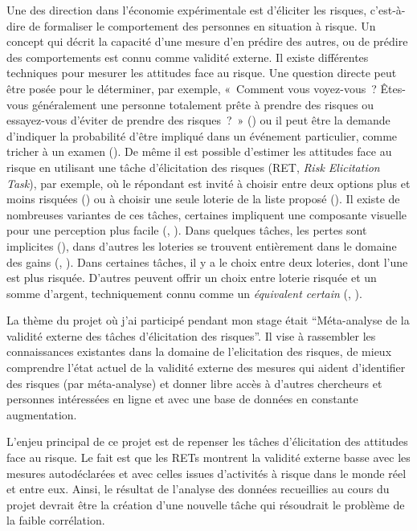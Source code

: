 \documentclass[12pt]{article}
\begin{document}
Une des direction dans l'économie expérimentale est d'éliciter les
risques, c'est-à-dire de formaliser le comportement des personnes en
situation à risque. Un concept qui décrit la capacité d'une mesure d'en
prédire des autres, ou de prédire des comportements est connu comme
validité externe. Il existe différentes techniques pour mesurer les
attitudes face au risque. Une question directe peut être posée pour le
déterminer, par exemple, «~Comment vous voyez-vous~? Êtes-vous
généralement une personne totalement prête à prendre des risques ou
essayez-vous d'éviter de prendre des risques~?~» (\citet{SOEP2007}) ou
il peut être la demande d'indiquer la probabilité d'être impliqué dans
un événement particulier, comme tricher à un examen (\citet{Blais2006}).
De même il est possible d'estimer les attitudes face au risque en
utilisant une tâche d'élicitation des risques (RET, \emph{Risk
Elicitation Task}), par exemple, où le répondant est invité à choisir
entre deux options plus et moins risquées (\citet{Holt2002}) ou à
choisir une seule loterie de la liste proposé (\citet{Eckel2002}). Il
existe de nombreuses variantes de ces tâches, certaines impliquent une
composante visuelle pour une perception plus facile (\citet{Lejuez2002},
\citet{Crosetto2013}). Dans quelques tâches, les pertes sont implicites
(\citet{Menkhoff_Sakha_2017}), dans d'autres les loteries se trouvent
entièrement dans le domaine des gains (\citet{Eckel2002},
\citet{Holt2002}). Dans certaines tâches, il y a le choix entre deux
loteries, dont l'une est plus risquée. D'autres peuvent offrir un choix
entre loterie risquée et un somme d'argent, techniquement connu comme un
\emph{équivalent certain} (\citet{Menkhoff_Sakha_2017},
\citet{Csermely2014}).

La thème du projet où j'ai participé pendant mon stage était
``Méta-analyse de la validité externe des tâches d'élicitation des
risques''. Il vise à rassembler les connaissances existantes dans la
domaine de l'elicitation des risques, de mieux comprendre l'état actuel
de la validité externe des mesures qui aident d'identifier des risques
(par méta-analyse) et donner libre accès à d'autres chercheurs et
personnes intéressées en ligne et avec une base de données en constante
augmentation.

L'enjeu principal de ce projet est de repenser les tâches d'élicitation
des attitudes face au risque. Le fait est que les RETs montrent la
validité externe basse avec les mesures autodéclarées et avec celles
issues d'activités à risque dans le monde réel et entre eux. Ainsi, le
résultat de l'analyse des données recueillies au cours du projet devrait
être la création d'une nouvelle tâche qui résoudrait le problème de la
faible corrélation.
\end{document}
